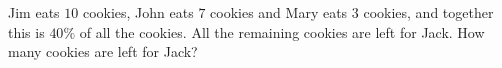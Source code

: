 Jim eats $10$ cookies, John eats $7$ cookies and Mary eats $3$ cookies, and together this is $40\%$ of all the cookies. All the remaining cookies are left for Jack. How many cookies are left for Jack?
